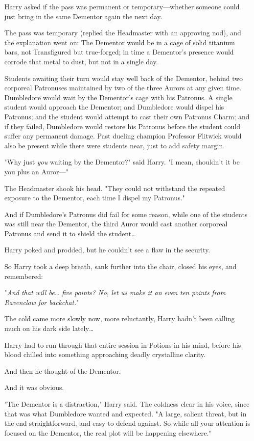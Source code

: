 Harry asked if the pass was permanent or temporary---whether someone could just
bring in the same Dementor again the next day.

The pass was temporary (replied the Headmaster with an approving nod), and the
explanation went on: The Dementor would be in a cage of solid titanium bars,
not Transfigured but true-forged; in time a Dementor's presence would corrode
that metal to dust, but not in a single day.

Students awaiting their turn would stay well back of the Dementor, behind two
corporeal Patronuses maintained by two of the three Aurors at any given time.
Dumbledore would wait by the Dementor's cage with his Patronus. A single
student would approach the Dementor; and Dumbledore would dispel his Patronus;
and the student would attempt to cast their own Patronus Charm; and if they
failed, Dumbledore would restore his Patronus before the student could suffer
any permanent damage. Past dueling champion Professor Flitwick would also be
present while there were students near, just to add safety margin.

"Why just \emph{you} waiting by the Dementor?" said Harry. "I mean, shouldn't
it be you plus an Auror---"

The Headmaster shook his head. "They could not withstand the repeated exposure
to the Dementor, each time I dispel my Patronus."

And if Dumbledore's Patronus did fail for some reason, while one of the
students was still near the Dementor, the third Auror would cast another
corporeal Patronus and send it to shield the student{\ldots}

Harry poked and prodded, but he couldn't see a flaw in the security.

So Harry took a deep breath, sank further into the chair, closed his eyes, and
remembered:

"\emph{And that will be{\ldots} five points? No, let us make it an even ten
points from Ravenclaw for backchat.}"

The cold came more slowly now, more reluctantly, Harry hadn't been calling much
on his dark side lately{\ldots}

Harry had to run through that entire session in Potions in his mind, before his
blood chilled into something approaching deadly crystalline clarity.

And then he thought of the Dementor.

And it was obvious.

"The Dementor is a distraction," Harry said. The coldness clear in his voice,
since that was what Dumbledore wanted and expected. "A large, salient threat,
but in the end straightforward, and easy to defend against. So while all your
attention is focused on the Dementor, the real plot will be happening
elsewhere."

